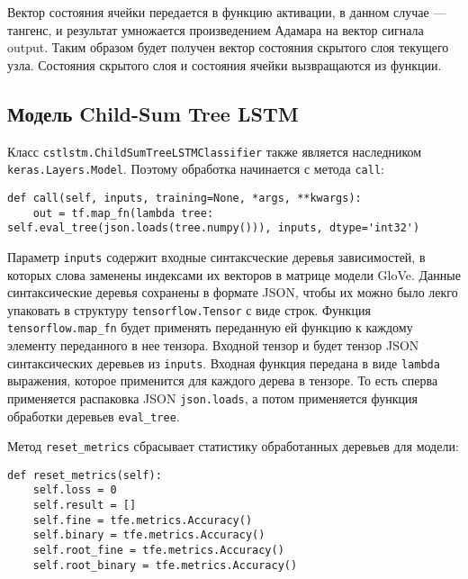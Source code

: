 Вектор состояния ячейки передается в функцию активации, в данном случае --- тангенс, и результат умножается произведением Адамара на вектор сигнала output. Таким образом будет получен вектор состояния скрытого слоя текущего узла. Состояния скрытого слоя и состояния ячейки вызвращаются из функции.

\subsection{Модель Child-Sum Tree LSTM}
Класс \texttt{cstlstm.ChildSumTreeLSTMClassifier} также является наследником \texttt{keras.Layers.Model}. Поэтому обработка начинается с метода \texttt{call}:
\medskip
\begin{lstlisting}[style=Python]
  def call(self, inputs, training=None, *args, **kwargs):
    out = tf.map_fn(lambda tree: self.eval_tree(json.loads(tree.numpy())), inputs, dtype='int32')
\end{lstlisting}
\medskip

Параметр \texttt{inputs} содержит входные синтаксческие деревья зависимостей, в которых слова заменены индексами их векторов в матрице модели GloVe. Данные синтаксические деревья сохранены в формате JSON, чтобы их можно было лекго упаковать в структуру \texttt{tensorflow.Tensor} с виде строк. Функция \texttt{tensorflow.map\_fn} будет применять переданную ей функцию к каждому элементу переданного в нее тензора. Входной тензор и будет тензор JSON синтаксических деревьев из \texttt{inputs}. Входная функция передана в виде \texttt{lambda} выражения, которое применится для каждого дерева в тензоре. То есть сперва применяется распаковка JSON \texttt{json.loads}, а потом применяется функция обработки деревьев \texttt{eval\_tree}.

Метод \texttt{reset\_metrics} сбрасывает статистику обработанных деревьев для модели:
\medskip
\begin{lstlisting}[style=Python]
  def reset_metrics(self):
    self.loss = 0
    self.result = []
    self.fine = tfe.metrics.Accuracy()
    self.binary = tfe.metrics.Accuracy()
    self.root_fine = tfe.metrics.Accuracy()
    self.root_binary = tfe.metrics.Accuracy()
\end{lstlisting}
\medskip

